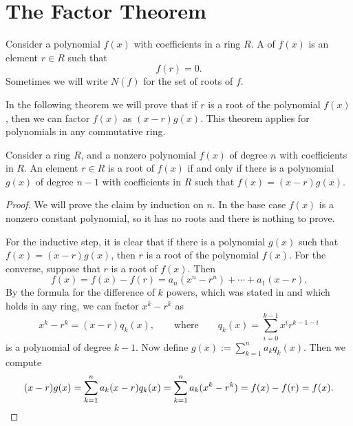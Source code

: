 \section{The Factor Theorem}

\begin{definition}
  Consider a polynomial $f(x)$ with coefficients in a ring $R$. A  of $f(x)$ is an element $r\in R$ such that
  \begin{equation*}
    f(r)=0.
  \end{equation*}
  Sometimes we will write $N(f)$ for the set of roots of $f$.
\end{definition}

In the following theorem we will prove that if $r$ is a root of the polynomial $f(x)$, then we can factor $f(x)$ as $(x-r)g(x)$. This theorem applies for polynomials in any commutative ring.

\begin{theorem}\label{theorem:factor-theorem}
  Consider a ring $R$, and a nonzero polynomial $f(x)$ of degree $n$ with coefficients in $R$.
  An element $r\in R$ is a root of $f(x)$ if and only if there is a polynomial $g(x)$ of degree $n-1$ with coefficients in $R$ such that $f(x)=(x-r)g(x)$.
\end{theorem}

\begin{proof}
  We will prove the claim by induction on $n$. In the base case $f(x)$ is a nonzero constant polynomial, so it has no roots and there is nothing to prove.

  For the inductive step, it is clear that if there is a polynomial $g(x)$ such that $f(x)=(x-r)g(x)$, then $r$ is a root of the polynomial $f(x)$. For the converse, suppose that $r$ is a root of $f(x)$. Then
  \begin{equation*}
    f(x) = f(x)-f(r) = a_n(x^n-r^n)+\cdots + a_1(x-r).
  \end{equation*}
  By the formula for the difference of $k$\supth{} powers, which was stated in  and which holds in any ring, we can factor $x^k-r^k$ as
  \begin{equation*}
    x^k-r^k=(x-r)q_k(x),\qquad\text{where}\qquad q_k(x)=\sum_{i=0}^{k-1}x^ir^{k-1-i}
  \end{equation*}
  is a polynomial of degree $k-1$. Now define $g(x) := \sum_{k=1}^{n}a_k q_k(x)$. Then we compute
  \begin{equation*}
    (x-r)g(x)=\sum_{k=1}^{n}a_k (x-r)q_k(x)=\sum_{k=1}^{n}a_k (x^k-r^k)=f(x)-f(r)=f(x).\qedhere
  \end{equation*}
\end{proof}

